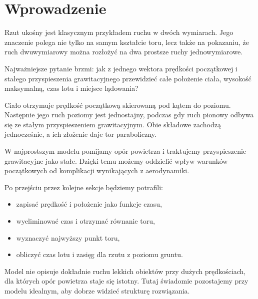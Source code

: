\section{Wprowadzenie}

Rzut ukośny jest klasycznym przykładem ruchu w dwóch wymiarach. Jego znaczenie
polega nie tylko na samym kształcie toru, lecz także na pokazaniu, że ruch
dwuwymiarowy można rozłożyć na dwa prostsze ruchy jednowymiarowe.

Najważniejsze pytanie brzmi: jak z jednego wektora prędkości początkowej i
stałego przyspieszenia grawitacyjnego przewidzieć całe położenie ciała,
wysokość maksymalną, czas lotu i miejsce lądowania?

Ciało otrzymuje prędkość początkową skierowaną pod kątem do poziomu. Następnie
jego ruch poziomy jest jednostajny, podczas gdy ruch pionowy odbywa się ze
stałym przyspieszeniem grawitacyjnym. Obie składowe zachodzą jednocześnie,
a ich złożenie daje tor paraboliczny.

W najprostszym modelu pomijamy opór powietrza i traktujemy przyspieszenie
grawitacyjne jako stałe. Dzięki temu możemy oddzielić wpływ warunków
początkowych od komplikacji wynikających z aerodynamiki.

Po przejściu przez kolejne sekcje będziemy potrafili:
\begin{itemize}
  \item zapisać prędkość i położenie jako funkcje czasu,
  \item wyeliminować czas i otrzymać równanie toru,
  \item wyznaczyć najwyższy punkt toru,
  \item obliczyć czas lotu i zasięg dla rzutu z poziomu gruntu.
\end{itemize}

Model nie opisuje dokładnie ruchu lekkich obiektów przy dużych prędkościach,
dla których opór powietrza staje się istotny. Tutaj świadomie pozostajemy przy
modelu idealnym, aby dobrze widzieć strukturę rozwiązania.
